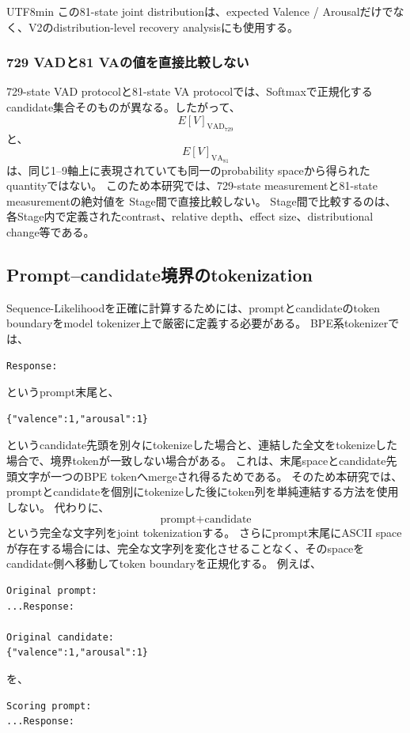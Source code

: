 \documentclass{article} %
\begin{document}
\begin{CJK*}{UTF8}{min}
この81-state joint distributionは、expected Valence / Arousalだけでなく、V2のdistribution-level recovery analysisにも使用する。


\subsubsection{729 VADと81 VAの値を直接比較しない}

729-state VAD protocolと81-state VA protocolでは、Softmaxで正規化するcandidate集合そのものが異なる。したがって、
\[
E[V]_{\mathrm{VAD}_{729}}
\]
と、
\[
E[V]_{\mathrm{VA}_{81}}
\]
は、同じ1--9軸上に表現されていても同一のprobability spaceから得られたquantityではない。
このため本研究では、729-state measurementと81-state measurementの絶対値を
Stage間で直接比較しない。
Stage間で比較するのは、各Stage内で定義されたcontrast、relative depth、effect size、distributional change等である。


\subsection{Prompt--candidate境界のtokenization}
\label{app:tokenization_boundary}

Sequence-Likelihoodを正確に計算するためには、promptとcandidateのtoken boundaryをmodel tokenizer上で厳密に定義する必要がある。
BPE系tokenizerでは、
\begin{verbatim}
Response: 
\end{verbatim}
というprompt末尾と、
\begin{verbatim}
{"valence":1,"arousal":1}
\end{verbatim}
というcandidate先頭を別々にtokenizeした場合と、連結した全文をtokenizeした場合で、境界tokenが一致しない場合がある\citep{sennrich2016neural}。
これは、末尾spaceとcandidate先頭文字が一つのBPE tokenへmergeされ得るためである。
そのため本研究では、promptとcandidateを個別にtokenizeした後にtoken列を単純連結する方法を使用しない。
代わりに、
\[
\text{prompt}
+
\text{candidate}
\]
という完全な文字列をjoint tokenizationする。
さらにprompt末尾にASCII spaceが存在する場合には、完全な文字列を変化させることなく、そのspaceをcandidate側へ移動してtoken boundaryを正規化する。
例えば、
\begin{verbatim}
Original prompt:
...Response: 

Original candidate:
{"valence":1,"arousal":1}
\end{verbatim}
を、
\begin{verbatim}
Scoring prompt:
...Response:


\end{verbatim}
\end{CJK*}
\end{document}
